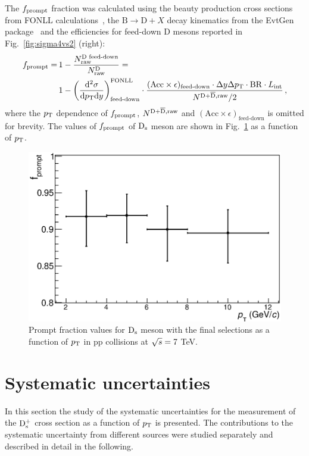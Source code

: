 The $f_{\rm prompt}$ fraction was calculated using the beauty production cross sections from  
FONLL calculations~\cite{Cacciari:1998it, Cacciari:2001td}, the 
$\mathrm{B} \rightarrow \mathrm{D} + X$ decay kinematics from the EvtGen package~\cite{Lange:2001uf} 
and the efficiencies for feed-down D mesons reported in 
Fig.~\ref{fig:sigma4vs2} (right):
\begin{equation}
\label{eq:fpr}
\begin{split}
f_{\mathrm{prompt}} = \, & 1- \frac{N^{\text{D~feed-down}}_{\mathrm{raw}}}{N^{\mathrm{D}}_{\mathrm{raw}}}=\\
& 1- \left (\frac{\rm d^2 \sigma}{\mathrm dp_{\rm T} \mathrm d y} \right)^{\rm FONLL}_{\text{feed-down}} \cdot \frac{(\mathrm{Acc} \times \epsilon)_\text{feed-down} \cdot \Delta y \Delta p_{\rm T} \cdot \mathrm{BR} \cdot L_{\rm int}}{N^{\rm D +\overline{D},raw}/2}\,,
\end{split}
\end{equation}
where the $p_{\rm T}$ dependence of $f_{\rm prompt}$, $N^{\rm D +\overline{D},raw}$ and
$(\mathrm{Acc} \times \epsilon)_\text{feed-down}$ is omitted for brevity.
The values of $f_{\rm prompt}$ of ${\rm D_s}$ meson are shown in Fig.~\ref{fig:fprompt} as a function of $p_{\rm T}$.
\begin{figure}[!t]
\begin{center}
\includegraphics[width=.48\textwidth]{FigCap4/promptFraction_pass4.eps}
\caption{Prompt fraction values for ${\rm D_s}$ meson with the final selections as a function of $p_{\rm T}$ in pp collisions at $\sqrt{s} = 7$ TeV.}
\label{fig:fprompt}
\end{center}
\end{figure}



\section{Systematic uncertainties}
\label{sec:systPP}
In this section the study of the systematic uncertainties for the
 measurement of the ${\rm D_s^+}$ cross section as a function of $p_{\rm T}$ is presented. 
 The contributions to the systematic uncertainty from different 
 sources were studied separately and described in detail in the following.

